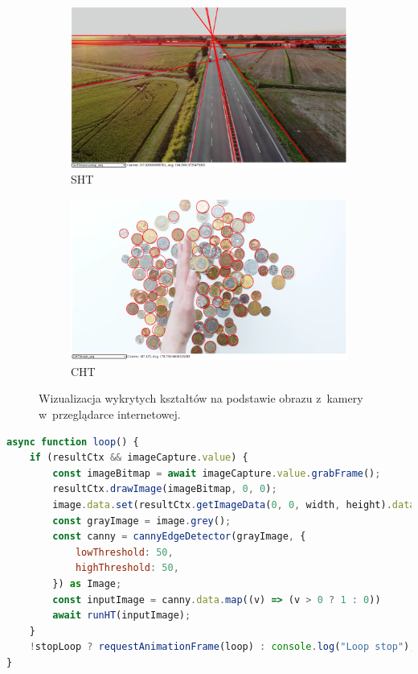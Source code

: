 \begin{figure}
    \centering
    \begin{subfigure}{0.48\textwidth}
        \centering
        \includegraphics[width=\linewidth]{img/road.png}
        \caption{SHT}\label{fig:road}
    \end{subfigure}\hfill
    \begin{subfigure}{0.48\textwidth}
        \centering
        \includegraphics[width=\linewidth]{img/money.png}
        \caption{CHT}\label{fig:money}
    \end{subfigure}
    \caption{Wizualizacja wykrytych kształtów na podstawie obrazu z~kamery w~przeglądarce internetowej.}
    \label{fig:road-money}
\end{figure}

\begin{lstlisting}[language=JavaScript, float=ht, label=lst:loop, caption=Funkcja przetwarzająca w~pętli kolejne klatki obrazu z~kamery.]
async function loop() {
    if (resultCtx && imageCapture.value) {
        const imageBitmap = await imageCapture.value.grabFrame();
        resultCtx.drawImage(imageBitmap, 0, 0);
        image.data.set(resultCtx.getImageData(0, 0, width, height).data);
        const grayImage = image.grey();
        const canny = cannyEdgeDetector(grayImage, {
            lowThreshold: 50,
            highThreshold: 50,
        }) as Image;
        const inputImage = canny.data.map((v) => (v > 0 ? 1 : 0))
        await runHT(inputImage);
    }
    !stopLoop ? requestAnimationFrame(loop) : console.log("Loop stop");
}
\end{lstlisting}

